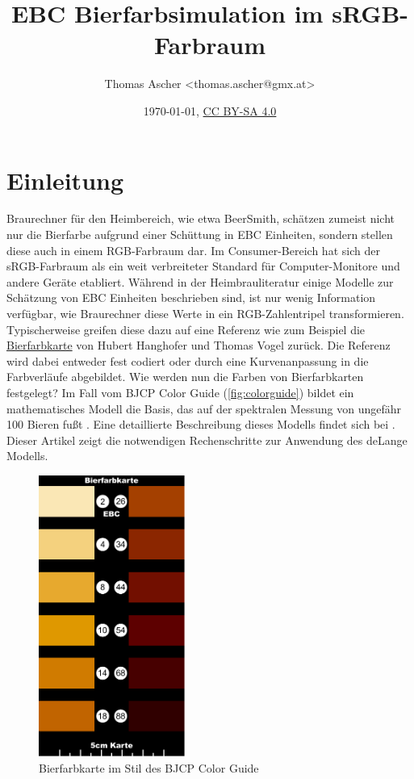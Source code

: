 \documentclass[10pt,a4paper,DIV=12,parskip=half]{scrarticle}
\title{EBC Bierfarbsimulation im sRGB-Farbraum}
\author{Thomas Ascher <thomas.ascher@gmx.at>}
\date{\today, \href{http://creativecommons.org/licenses/by-sa/4.0/}{CC BY-SA 4.0}}
\begin{document}
\maketitle

\section*{Einleitung}

Braurechner für den Heimbereich, wie etwa BeerSmith, schätzen zumeist nicht nur die Bierfarbe aufgrund einer Schüttung in EBC Einheiten, sondern stellen diese auch in einem RGB-Farbraum dar. Im Consumer-Bereich hat sich der sRGB-Farbraum als ein weit verbreiteter Standard für Computer-Monitore und andere Geräte etabliert. Während in der Heimbrauliteratur einige Modelle zur Schätzung von EBC Einheiten beschrieben sind, ist nur wenig Information verfügbar, wie Braurechner diese Werte in ein RGB-Zahlentripel transformieren. Typischerweise greifen diese dazu auf eine Referenz wie zum Beispiel die \href{https://www.bierfarbkarte.de}{Bierfarbkarte} von Hubert Hanghofer und Thomas Vogel zurück. Die Referenz wird dabei entweder fest codiert oder durch eine Kurvenanpassung in die Farbverläufe abgebildet. Wie werden nun die Farben von Bierfarbkarten festgelegt? Im Fall vom BJCP Color Guide (\autoref{fig:colorguide}) bildet ein mathematisches Modell die Basis, das auf der spektralen Messung von ungefähr 100 Bieren fußt \parencite{BJCP}. Eine detaillierte Beschreibung dieses Modells findet sich bei \cite{deLange2016}. Dieser Artikel zeigt die notwendigen Rechenschritte zur Anwendung des deLange Modells.

\begin{figure}[H]
	\centering
	\includegraphics[width=4.8cm]{color_guide.pdf}
	\caption{Bierfarbkarte im Stil des BJCP Color Guide}
	\label{fig:colorguide}
\end{figure}
\end{document}
